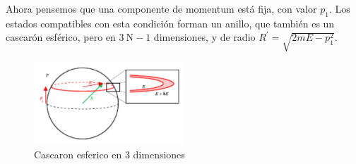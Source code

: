 Ahora pensemos que una componente de momentum está fija, con valor $p_1$. Los estados compatibles con esta condición forman un anillo, que también es un cascarón esférico, pero en $3 \mathrm{~N}-1$ dimensiones, y de radio $R^{\prime}=\sqrt{2 m E-p_1^2}$.
\begin{figure}[h]
    \centering
    \includegraphics[width=0.5\textwidth]{punto1/cascaron.png}
    \caption{Cascaron esferico en 3 dimensiones}
    \label{fig:my_label}
\end{figure}

